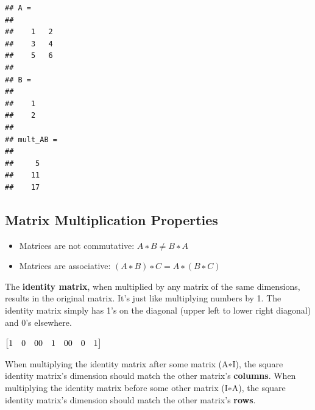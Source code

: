 \documentclass[
]{article}
\providecommand{\tightlist}{%
  \setlength{\itemsep}{0pt}\setlength{\parskip}{0pt}}
\begin{document}
\begin{verbatim}
## A =
## 
##    1   2
##    3   4
##    5   6
## 
## B =
## 
##    1
##    2
## 
## mult_AB =
## 
##     5
##    11
##    17
\end{verbatim}

\hypertarget{matrix-multiplication-properties}{%
\subsection{Matrix Multiplication
Properties}\label{matrix-multiplication-properties}}

\begin{itemize}
\tightlist
\item
  Matrices are not commutative: \(A∗B \neq B∗A\)
\item
  Matrices are associative: \((A∗B)∗C = A∗(B∗C)\)
\end{itemize}

The \textbf{identity matrix}, when multiplied by any matrix of the same
dimensions, results in the original matrix. It's just like multiplying
numbers by 1. The identity matrix simply has 1's on the diagonal (upper
left to lower right diagonal) and 0's elsewhere.

\(\begin{bmatrix} 1 & 0 & 0 \newline 0 & 1 & 0 \newline 0 & 0 & 1 \newline \end{bmatrix}\)

When multiplying the identity matrix after some matrix (A∗I), the square
identity matrix's dimension should match the other matrix's
\textbf{columns}. When multiplying the identity matrix before some other
matrix (I∗A), the square identity matrix's dimension should match the
other matrix's \textbf{rows}.
\end{document}
